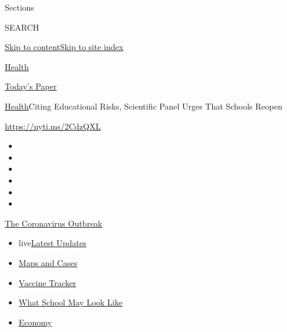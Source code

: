 Sections

SEARCH

\protect\hyperlink{site-content}{Skip to
content}\protect\hyperlink{site-index}{Skip to site index}

\href{https://www.nytimes.com/section/health}{Health}

\href{https://myaccount.nytimes.com/auth/login?response_type=cookie\&client_id=vi}{}

\href{https://www.nytimes.com/section/todayspaper}{Today's Paper}

\href{/section/health}{Health}\textbar{}Citing Educational Risks,
Scientific Panel Urges That Schools Reopen

\url{https://nyti.ms/2CdzQXL}

\begin{itemize}
\item
\item
\item
\item
\item
\item
\end{itemize}

\href{https://www.nytimes.com/news-event/coronavirus?action=click\&pgtype=Article\&state=default\&region=TOP_BANNER\&context=storylines_menu}{The
Coronavirus Outbreak}

\begin{itemize}
\tightlist
\item
  live\href{https://www.nytimes.com/2020/08/02/world/coronavirus-updates.html?action=click\&pgtype=Article\&state=default\&region=TOP_BANNER\&context=storylines_menu}{Latest
  Updates}
\item
  \href{https://www.nytimes.com/interactive/2020/us/coronavirus-us-cases.html?action=click\&pgtype=Article\&state=default\&region=TOP_BANNER\&context=storylines_menu}{Maps
  and Cases}
\item
  \href{https://www.nytimes.com/interactive/2020/science/coronavirus-vaccine-tracker.html?action=click\&pgtype=Article\&state=default\&region=TOP_BANNER\&context=storylines_menu}{Vaccine
  Tracker}
\item
  \href{https://www.nytimes.com/interactive/2020/07/29/us/schools-reopening-coronavirus.html?action=click\&pgtype=Article\&state=default\&region=TOP_BANNER\&context=storylines_menu}{What
  School May Look Like}
\item
  \href{https://www.nytimes.com/live/2020/07/31/business/stock-market-today-coronavirus?action=click\&pgtype=Article\&state=default\&region=TOP_BANNER\&context=storylines_menu}{Economy}
\end{itemize}

